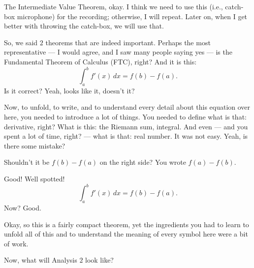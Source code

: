 \begin{spoken-clean}[00:08:35 - 00:10:32]
The Intermediate Value Theorem, okay. I think we need to use this (i.e., catch-box microphone) for the recording; otherwise, I will repeat. Later on, when I get better with throwing the catch-box, we will use that.

So, we said $2$ theorems that are indeed important. Perhaps the most representative --- I would agree, and I saw many people saying yes --- is the Fundamental Theorem of Calculus (FTC), right? And it is this:
\[
\int_a^b f'(x) \, dx = f(b) - f(a).
\]
Is it correct? Yeah, looks like it, doesn't it?

Now, to unfold, to write, and to understand every detail about this equation over here, you needed to introduce a lot of things. You needed to define what is that: derivative, right? What is this: the Riemann sum, integral. And even --- and you spent a lot of time, right? --- what is that: real number. It was not easy. Yeah, is there some mistake?
\end{spoken-clean}

\begin{student-interaction}
Shouldn't it be $f(b) - f(a)$ on the right side? You wrote $f(a) - f(b)$.
\end{student-interaction}

\begin{spoken-clean}[00:10:32 - 00:11:45]
Good! Well spotted! 
\[
\int_a^b f'(x) \, dx = f(b) - f(a).
\]
Now? Good.

Okay, so this is a fairly compact theorem, yet the ingredients you had to learn to unfold all of this and to understand the meaning of every symbol here were a bit of work.

Now, what will Analysis $2$ look like?
\end{spoken-clean}

